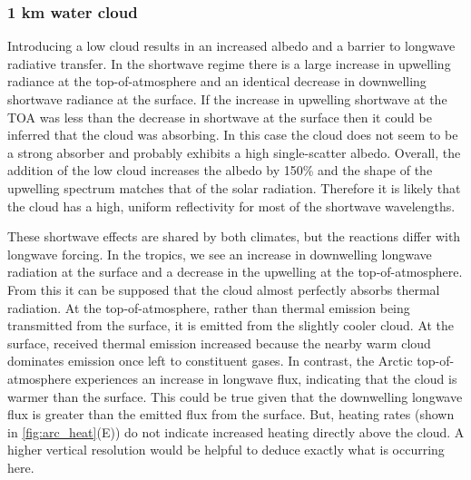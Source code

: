\documentclass[twocol]{ametsoc}
\begin{document}
\subsubsection{1 km water cloud}
Introducing a low cloud results in an increased albedo and a barrier to longwave radiative transfer. In the shortwave regime there is a large increase in upwelling radiance at the top-of-atmosphere and an identical decrease in downwelling shortwave radiance at the surface. If the increase in upwelling shortwave at the TOA was less than the decrease in shortwave at the surface then it could be inferred that the cloud was absorbing. In this case the cloud does not seem to be a strong absorber and probably exhibits a high single-scatter albedo. Overall, the addition of the low cloud increases the albedo by 150\% and the shape of the upwelling spectrum matches that of the solar radiation. Therefore it is likely that the cloud has a high, uniform reflectivity for most of the shortwave wavelengths.

These shortwave effects are shared by both climates, but the reactions differ with longwave forcing. In the tropics, we see an increase in downwelling longwave radiation at the surface and a decrease in the upwelling at the top-of-atmosphere. From this it can be supposed that the cloud almost perfectly absorbs thermal radiation. At the top-of-atmosphere, rather than thermal emission being transmitted from the surface, it is emitted from the slightly cooler cloud. At the surface, received thermal emission increased because the nearby warm cloud dominates emission once left to constituent gases. In contrast, the Arctic top-of-atmosphere experiences an increase in longwave flux, indicating that the cloud is warmer than the surface. This could be true given that the downwelling longwave flux is greater than the emitted flux from the surface. But, heating rates (shown in \autoref{fig:arc_heat}(E)) do not indicate increased heating directly above the cloud. A higher vertical resolution would be helpful to deduce exactly what is occurring here.
\end{document}
